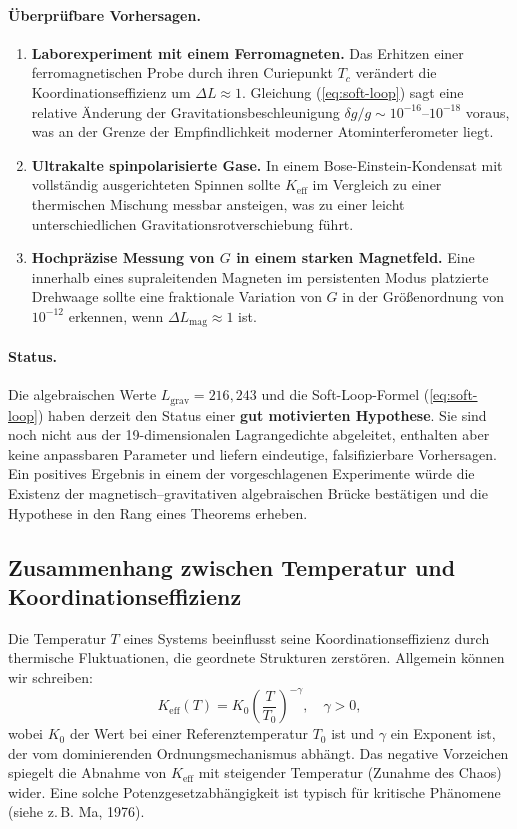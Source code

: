 \documentclass[12pt]{article}
\theoremstyle{remark}
\newcommand{\Keff}{K_{\mathrm{eff}}}
\begin{document}
	\paragraph{Überprüfbare Vorhersagen.}
	\begin{enumerate}
		\item \textbf{Laborexperiment mit einem Ferromagneten.}
		Das Erhitzen einer ferromagnetischen Probe durch ihren Curiepunkt $T_c$ verändert die
		Koordinationseffizienz um $\Delta L \approx 1$.  
		Gleichung (\ref{eq:soft-loop}) sagt eine relative Änderung der Gravitationsbeschleunigung
		$\delta g / g \sim 10^{-16}$–$10^{-18}$ voraus, was an der Grenze der Empfindlichkeit
		moderner Atominterferometer liegt.
		\item \textbf{Ultrakalte spinpolarisierte Gase.}
		In einem Bose-Einstein-Kondensat mit vollständig ausgerichteten Spinnen sollte $K_{\mathrm{eff}}$
		im Vergleich zu einer thermischen Mischung messbar ansteigen, was zu einer leicht unterschiedlichen
		Gravitationsrotverschiebung führt.
		\item \textbf{Hochpräzise Messung von $G$ in einem starken Magnetfeld.}
		Eine innerhalb eines supraleitenden Magneten im persistenten Modus platzierte Drehwaage
		sollte eine fraktionale Variation von $G$ in der Größenordnung von $10^{-12}$ erkennen,
		wenn $\Delta L_{\mathrm{mag}} \approx 1$ ist.
	\end{enumerate}
	
	\paragraph{Status.}
	Die algebraischen Werte $L_{\mathrm{grav}} = 216, 243$ und die Soft-Loop-Formel
	(\ref{eq:soft-loop}) haben derzeit den Status einer \textbf{gut motivierten Hypothese}.
	Sie sind noch nicht aus der 19-dimensionalen Lagrangedichte abgeleitet, enthalten aber
	keine anpassbaren Parameter und liefern eindeutige, falsifizierbare Vorhersagen.
	Ein positives Ergebnis in einem der vorgeschlagenen Experimente würde die Existenz
	der magnetisch–gravitativen algebraischen Brücke bestätigen und die Hypothese in den
	Rang eines Theorems erheben.
	
	\subsection{Zusammenhang zwischen Temperatur und Koordinationseffizienz}
	\label{subsec:temp-keff}
	
	Die Temperatur $T$ eines Systems beeinflusst seine Koordinationseffizienz durch thermische Fluktuationen, die geordnete Strukturen zerstören. Allgemein können wir schreiben:
	\begin{equation}
		\Keff(T) = K_0 \left( \frac{T}{T_0} \right)^{-\gamma}, \quad \gamma > 0,
		\label{eq:keff-temp}
	\end{equation}
	wobei $K_0$ der Wert bei einer Referenztemperatur $T_0$ ist und $\gamma$ ein Exponent ist, der vom dominierenden Ordnungsmechanismus abhängt. Das negative Vorzeichen spiegelt die Abnahme von $\Keff$ mit steigender Temperatur (Zunahme des Chaos) wider. Eine solche Potenzgesetzabhängigkeit ist typisch für kritische Phänomene (siehe z. B. Ma, 1976).
	
\end{document}
